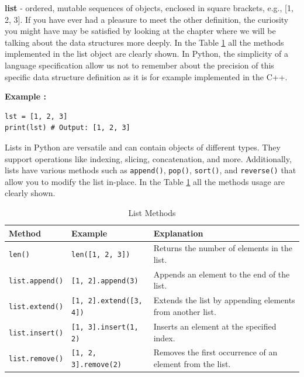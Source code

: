 \documentclass[12pt]{book}
\newtheorem{Example}{Example}[chapter]
\renewenvironment{Example}{\begin{trivlist}\item\relax
\textbf{Example \thesection: }}{\end{trivlist}}
\begin{document}
\begin{itemize}
\item \textbf{list} - ordered, mutable sequences of objects, enclosed in square brackets, e.g., [1, 2, 3]. If you have ever had a pleasure to meet the other definition, the curiosity you might have may be satisfied by looking at the chapter where we will be talking about the data structures more deeply. In the Table \ref{tab:list-methods} all the methods implemented in the list object are clearly shown. In Python, the simplicity of a language specification allow us not to remember about the precision of this specific data structure definition as it is for example implemented in the C++. 
\begin{Example}
\begin{lstlisting}
lst = [1, 2, 3]
print(lst) # Output: [1, 2, 3]
\end{lstlisting}
\end{Example}
Lists in Python are versatile and can contain objects of different types. They support operations like indexing, slicing, concatenation, and more. Additionally, lists have various methods such as \texttt{append()}, \texttt{pop()}, \texttt{sort()}, and \texttt{reverse()} that allow you to modify the list in-place. In the Table \ref{tab:list-methods} all the methods usage are clearly shown.
\begin{table}[h]
\centering
{}
\caption{List Methods}
\label{tab:list-methods}
\begin{tabular}{|l|l|p{7cm}|}
\hline
\textbf{Method} & \textbf{Example} & \textbf{Explanation} \\
\hline
\texttt{len()} & \texttt{len([1, 2, 3])} & Returns the number of elements in the list. \\
\hline
\texttt{list.append()} & \texttt{[1, 2].append(3)} & Appends an element to the end of the list. \\
\hline
\texttt{list.extend()} & \texttt{[1, 2].extend([3, 4])} & Extends the list by appending elements from another list. \\
\hline
\texttt{list.insert()} & \texttt{[1, 3].insert(1, 2)} & Inserts an element at the specified index. \\
\hline
\texttt{list.remove()} & \texttt{[1, 2, 3].remove(2)} & Removes the first occurrence of an element from the list. \\

\end{tabular}
\end{table}
\end{itemize}
\end{document}
